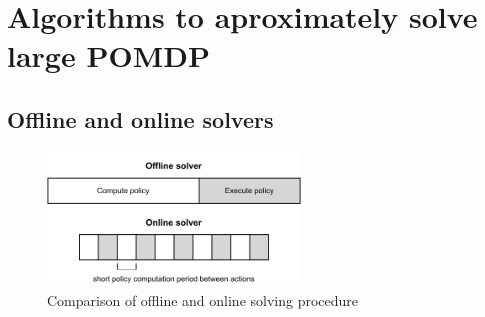 
\section{Algorithms to aproximately solve large POMDP}



\subsection{Offline and online solvers}


\begin{figure}[htbp]
    \centering
    \includegraphics[width=0.6\textwidth]{figures/online-offline.pdf}
    \caption{Comparison of offline and online solving procedure}
\end{figure}


